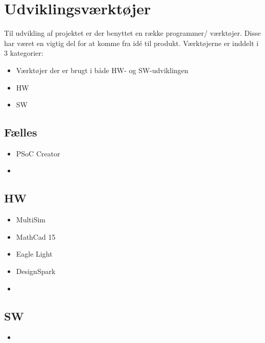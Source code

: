 \section{Udviklingsværktøjer}
Til udvikling af projektet er der benyttet en række programmer/ værktøjer. Disse har været en vigtig del for at komme fra idé til produkt. Værktøjerne er inddelt i 3 kategorier:
\begin{itemize}
\item Værktøjer der er brugt i både HW- og SW-udviklingen
\item HW
\item SW
\end{itemize}

\subsection{Fælles}
\begin{itemize}
\item PSoC Creator
\item 
\end{itemize}

\subsection{HW}
\begin{itemize}
\item MultiSim
\item MathCad 15
\item Eagle Light
\item DesignSpark
\item 
\end{itemize}

\subsection{SW} 
\begin{itemize}
\item 
\end{itemize}